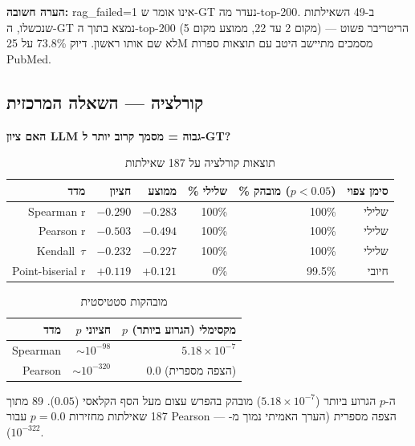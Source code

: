 \documentclass[12pt, a4paper]{article}
\begin{document}
\textbf{הערה חשובה:} \textenglish{rag\_failed=1} אינו אומר ש-\textenglish{GT} נעדר מה-\textenglish{top-200}. ב-49 השאילתות שנכשלו, ה-\textenglish{GT} נמצא בתוך ה-\textenglish{top-200} (מקום 2 עד 22, ממוצע מקום 5) --- הריטריבר פשוט לא שם אותו ראשון. דיוק 73.8\% על 25M מסמכים מתיישב היטב עם תוצאות ספרות \textenglish{PubMed}.

\subsection{קורלציה --- השאלה המרכזית}

\begin{center}
\textbf{האם ציון \textenglish{LLM} גבוה = מסמך קרוב יותר ל-\textenglish{GT}?}
\end{center}

\begin{table}[H]
\centering
\caption{תוצאות קורלציה על 187 שאילתות}
\begin{tabular}{rrrrrr}
\toprule
\textbf{מדד} & \textbf{חציון} & \textbf{ממוצע} & \textbf{\% שלילי} & \textbf{\% מובהק ($p{<}0.05$)} & \textbf{סימן צפוי} \\
\midrule
\textenglish{Spearman r} & $-0.290$ & $-0.283$ & 100\% & 100\% & שלילי \\
\textenglish{Pearson r}  & $-0.503$ & $-0.494$ & 100\% & 100\% & שלילי \\
\textenglish{Kendall}~$\tau$ & $-0.232$ & $-0.227$ & 100\% & 100\% & שלילי \\
\textenglish{Point-biserial r} & $+0.119$ & $+0.121$ & 0\%   & 99.5\% & חיובי \\
\bottomrule
\end{tabular}
\end{table}

\begin{table}[H]
\centering
\caption{מובהקות סטטיסטית}
\begin{tabular}{rrr}
\toprule
\textbf{מדד} & \textbf{$p$ חציוני} & \textbf{$p$ מקסימלי (הגרוע ביותר)} \\
\midrule
\textenglish{Spearman} & $\sim 10^{-98}$ & $5.18 \times 10^{-7}$ \\
\textenglish{Pearson}  & $\sim 10^{-320}$ & $0.0$ (הצפה מספרית) \\
\bottomrule
\end{tabular}
\end{table}

ה-$p$ הגרוע ביותר ($5.18 \times 10^{-7}$) מובהק בהפרש עצום מעל הסף הקלאסי ($0.05$). 89 מתוך 187 שאילתות מחזירות $p = 0.0$ עבור \textenglish{Pearson} --- הצפה מספרית (הערך האמיתי נמוך מ-$10^{-322}$).
\end{document}
